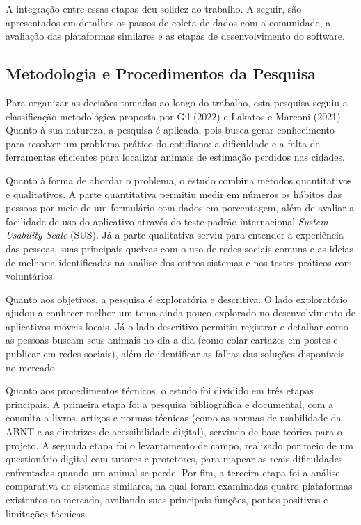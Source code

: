 A integração entre essas etapas deu solidez ao trabalho. A seguir, são apresentados em detalhes os passos de coleta de dados com a comunidade, a avaliação das plataformas similares e as etapas de desenvolvimento do software.

\clearpage

\subsection{Metodologia e Procedimentos da Pesquisa}

Para organizar as decisões tomadas ao longo do trabalho, esta pesquisa seguiu a classificação metodológica proposta por Gil (2022) e Lakatos e Marconi (2021). Quanto à sua natureza, a pesquisa é aplicada, pois busca gerar conhecimento para resolver um problema prático do cotidiano: a dificuldade e a falta de ferramentas eficientes para localizar animais de estimação perdidos nas cidades.

Quanto à forma de abordar o problema, o estudo combina métodos quantitativos e qualitativos. A parte quantitativa permitiu medir em números os hábitos das pessoas por meio de um formulário com dados em porcentagem, além de avaliar a facilidade de uso do aplicativo através do teste padrão internacional \textit{System Usability Scale} (SUS). Já a parte qualitativa serviu para entender a experiência das pessoas, suas principais queixas com o uso de redes sociais comuns e as ideias de melhoria identificadas na análise dos outros sistemas e nos testes práticos com voluntários.

Quanto aos objetivos, a pesquisa é exploratória e descritiva. O lado exploratório ajudou a conhecer melhor um tema ainda pouco explorado no desenvolvimento de aplicativos móveis locais. Já o lado descritivo permitiu registrar e detalhar como as pessoas buscam seus animais no dia a dia (como colar cartazes em postes e publicar em redes sociais), além de identificar as falhas das soluções disponíveis no mercado.

Quanto aos procedimentos técnicos, o estudo foi dividido em três etapas principais. A primeira etapa foi a pesquisa bibliográfica e documental, com a consulta a livros, artigos e normas técnicas (como as normas de usabilidade da ABNT e as diretrizes de acessibilidade digital), servindo de base teórica para o projeto. A segunda etapa foi o levantamento de campo, realizado por meio de um questionário digital com tutores e protetores, para mapear as reais dificuldades enfrentadas quando um animal se perde. Por fim, a terceira etapa foi a análise comparativa de sistemas similares, na qual foram examinadas quatro plataformas existentes no mercado, avaliando suas principais funções, pontos positivos e limitações técnicas.

